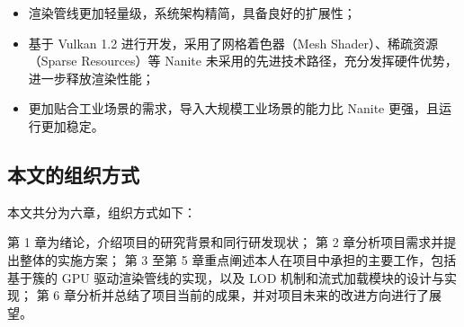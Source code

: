 \begin{itemize}
    \item 渲染管线更加轻量级，系统架构精简，具备良好的扩展性；
    \item 基于 Vulkan 1.2 进行开发，采用了网格着色器（Mesh Shader）、稀疏资源（Sparse Resources）等 Nanite 未采用的先进技术路径，充分发挥硬件优势，进一步释放渲染性能；
    \item 更加贴合工业场景的需求，导入大规模工业场景的能力比 Nanite 更强，且运行更加稳定。
\end{itemize}

\subsection{本文的组织方式}

本文共分为六章，组织方式如下：

第 1 章为绪论，介绍项目的研究背景和同行研发现状；
第 2 章分析项目需求并提出整体的实施方案；
第 3 至第 5 章重点阐述本人在项目中承担的主要工作，包括基于簇的 GPU 驱动渲染管线的实现，以及 LOD 机制和流式加载模块的设计与实现；
第 6 章分析并总结了项目当前的成果，并对项目未来的改进方向进行了展望。
